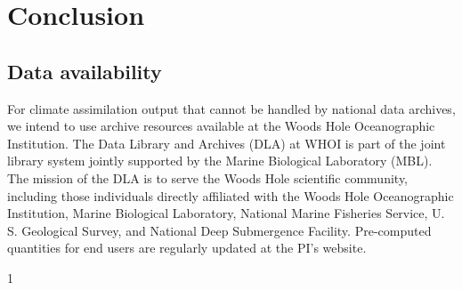 \documentclass[authoryear,round,12pt]{article}
\begin{document}
\section{Conclusion}
\label{sec:conclusion}

\subsection{Data availability}
\label{sec:data-availability}

For climate assimilation output that cannot be handled by national data
archives, we intend to use archive resources available at the Woods
Hole Oceanographic Institution. The Data Library and Archives (DLA) at
WHOI is part of the joint library system jointly supported by the
Marine Biological Laboratory (MBL). The mission of the DLA is to serve
the Woods Hole scientific community, including those individuals
directly affiliated with the Woods Hole Oceanographic Institution,
Marine Biological Laboratory, National Marine Fisheries Service,
U. S. Geological Survey, and National Deep Submergence Facility.
Pre-computed quantities for end users are regularly updated at the PI's website.

\cite[e.g.,][]{Gebbie--2019:Atlantica}
\cite[]{Dickson--1995:XX}1

\clearpage
\newpage
{}
\footnotesize
\addtocounter{section}{1}



\end{document}
